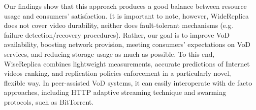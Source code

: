 Our findings show that this approach produces a good balance between resource usage and consumers' satisfaction. It is important to note, however, WideReplica does not cover video durability, neither does fault-tolerant mechanisms (e.g. failure detection/recovery procedures). Rather, our goal is to improve VoD availability, boosting network provision, meeting consumers' expectations on VoD services, and reducing storage usage as much as possible. To this end, WiseReplica combines lightweight measurements, accurate predictions of Internet videos ranking, and replication policies enforcement in a particularly novel, flexible way. In peer-assisted VoD systems, it can easily interoperate with de facto approaches, including HTTP adaptive streaming technique and swarming protocols, such as BitTorrent. 
